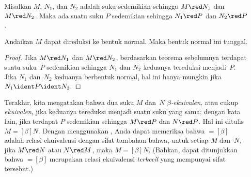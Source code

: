 \documentclass[../../../include/open-logic-section]{subfiles}
\begin{document}

\begin{thm}
Misalkan $M$, $N_1$, dan $N_2$ adalah suku sedemikian sehingga $M \red N_1$
dan $M \red N_2$. Maka ada suatu suku $P$ sedemikian sehingga $N_1 \red P$
dan $N_2 \red P$.
\end{thm}

\begin{cor}
Andaikan $M$ dapat direduksi ke bentuk normal. Maka bentuk normal ini tunggal.
\end{cor}

\begin{proof}
Jika $M \red N_1$ dan $M \red N_2$, berdasarkan teorema sebelumnya terdapat
suatu suku~$P$ sedemikian sehingga $N_1$ dan $N_2$ keduanya tereduksi
menjadi~$P$. Jika $N_1$ dan~$N_2$ keduanya berbentuk normal, hal ini hanya
mungkin jika $N_1 \ident P \ident N_2$.
\end{proof}

Terakhir, kita mengatakan bahwa dua suku $M$ dan~$N$ \emph{$\beta$-ekuivalen},
atau cukup \emph{ekuivalen}, jika keduanya tereduksi menjadi suatu suku yang
sama; dengan kata lain, jika terdapat $P$ sedemikian sehingga $M \red P$ dan
$N \red P$. Hal ini ditulis $M \equal[\beta] N$. Dengan menggunakan
, Anda dapat memeriksa bahwa $\equal[\beta]$ adalah
relasi ekuivalensi dengan sifat tambahan bahwa, untuk setiap $M$ dan~$N$, jika
$M \red N$ atau $N \red M$, maka $M \equal[\beta] N$. (Bahkan, dapat
ditunjukkan bahwa $\equal[\beta]$ merupakan relasi ekuivalensi \emph{terkecil}
yang mempunyai sifat tersebut.)
\end{document}

